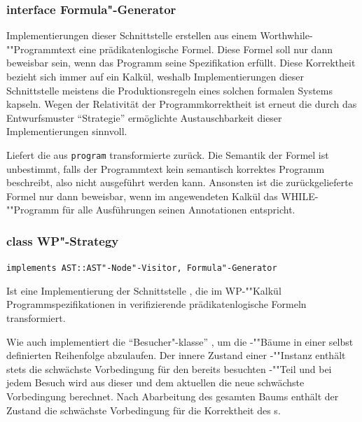 \subsubsection{interface Formula"-Generator}%

Implementierungen dieser Schnittstelle erstellen aus einem
Worthwhile-""Programmtext eine prädikatenlogische Formel. Diese Formel
soll nur dann beweisbar sein, wenn das Programm seine Spezifikation
erfüllt. Diese Korrektheit bezieht sich immer auf ein Kalkül, weshalb
Implementierungen dieser Schnittstelle meistens die Produktionsregeln
eines solchen formalen Systems kapseln. Wegen der Relativität der
Programmkorrektheit ist erneut die durch das Entwurfsmuster
"`Strategie"' ermöglichte Austauschbarkeit dieser Implementierungen
sinnvoll.%

\begin{description}%

    Liefert die aus \texttt{program} transformierte 
    zurück. Die Semantik der Formel ist unbestimmt, falls der
    Programmtext kein semantisch korrektes Programm beschreibt, also
    nicht ausgeführt werden kann. Ansonsten ist die zurückgelieferte
    Formel nur dann beweisbar, wenn im angewendeten Kalkül das
    WHILE-""Programm für alle Ausführungen seinen Annotationen
    entspricht.%

\end{description}%

\subsubsection{class WP"-Strategy}%

\texttt{implements AST::AST"-Node"-Visitor, Formula"-Generator}%

Ist eine Implementierung der Schnittstelle ,
die im WP-""Kalkül Programmspezifikationen in verifizierende
prädikatenlogische Formeln transformiert.%

Wie auch  implementiert  die
"`Besucher"-klasse"' , um die
-""Bäume in einer selbst definierten Reihenfolge
abzulaufen. Der innere Zustand einer -""Instanz
enthält stets die schwächste Vorbedingung für den bereits besuchten
-""Teil und bei jedem Besuch wird aus dieser und dem
aktuellen  die neue schwächste Vorbedingung
berechnet. Nach Abarbeitung des gesamten Baums enthält der Zustand die
schwächste Vorbedingung für die Korrektheit des s.%

